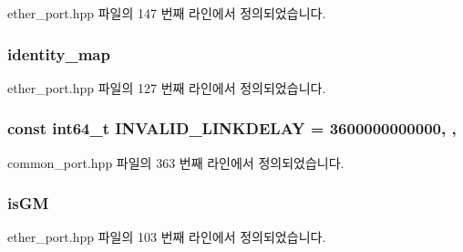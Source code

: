 ether\+\_\+port.\+hpp 파일의 147 번째 라인에서 정의되었습니다.

\subsubsection[{\texorpdfstring{identity\+\_\+map}{identity_map}}]{ identity\+\_\+map\hspace{0.3cm}{\ttfamily [private]}}\hypertarget{class_ether_port_af7d8b88bd14d1af7c3f5f8efd29de43f}{}\label{class_ether_port_af7d8b88bd14d1af7c3f5f8efd29de43f}


ether\+\_\+port.\+hpp 파일의 127 번째 라인에서 정의되었습니다.

\subsubsection[{\texorpdfstring{I\+N\+V\+A\+L\+I\+D\+\_\+\+L\+I\+N\+K\+D\+E\+L\+AY}{INVALID_LINKDELAY}}]{\setlength{\rightskip}{0pt plus 5cm}const {\bf int64\+\_\+t} I\+N\+V\+A\+L\+I\+D\+\_\+\+L\+I\+N\+K\+D\+E\+L\+AY = 3600000000000\hspace{0.3cm}{\ttfamily [static]}, {\ttfamily [protected]}, {\ttfamily [inherited]}}\hypertarget{class_common_port_a12f51c79445b27ce04e3693f4d5093d7}{}\label{class_common_port_a12f51c79445b27ce04e3693f4d5093d7}


common\+\_\+port.\+hpp 파일의 363 번째 라인에서 정의되었습니다.

\subsubsection[{\texorpdfstring{is\+GM}{isGM}}]{ is\+GM\hspace{0.3cm}{\ttfamily [private]}}\hypertarget{class_ether_port_ac1d89714b4aa7aa5414b44238e26d5a2}{}\label{class_ether_port_ac1d89714b4aa7aa5414b44238e26d5a2}


ether\+\_\+port.\+hpp 파일의 103 번째 라인에서 정의되었습니다.

